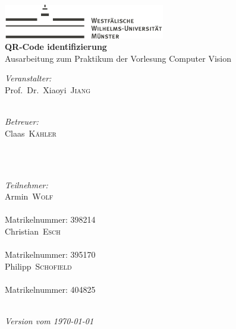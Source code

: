 
\begin{titlepage}
\begin{center}
\includegraphics[height=1.5cm, keepaspectratio]{images/Logo_WWU_Muenster.pdf} \\[1.0cm]
{\huge\sffamily\bfseries QR-Code identifizierung}\\[0.5cm]
{\large Ausarbeitung zum Praktikum der Vorlesung  Computer Vision}\\[3.0cm]
\begin{minipage}[b]{0.7\textwidth}
	\begin{minipage}[t]{.5\textwidth}
		{\large \textit{Veranstalter:}}\\[5pt]
		{\Large Prof.\ Dr.\ Xiaoyi\ \textsc{Jiang}}\\[4pt]
		{}\\[1.0cm]
	\end{minipage}%
    \begin{minipage}[t]{.5\textwidth}
		{\large \textit{Betreuer:}}\\[5pt]
		{\Large Claas\ \textsc{Kähler}}\\[4pt]
		{}\\[0.5cm]
	\end{minipage}
\end{minipage}%
\\[2cm]
\begin{minipage}[b]{0.7\textwidth}
	{\large \textit{Teilnehmer:}}\\[5pt]
	{\Large Armin\ \textsc{Wolf}}\\[4pt]
    {}\\[4pt]
    {\large Matrikelnummer: 398214}\\[0.5cm]   
	{\Large Christian\ \textsc{Esch}}\\[4pt]
	{}\\[4pt]
	{\large Matrikelnummer: 395170}\\[0.5cm] 	 
	{\Large Philipp\ \textsc{Schofield}}\\[4pt]
	{}\\[4pt] 
	{\large Matrikelnummer: 404825}\\[0.5cm]
\end{minipage}
\\[2cm]
{\large\itshape Version vom \today}\\
\end{center}


\end{titlepage}

